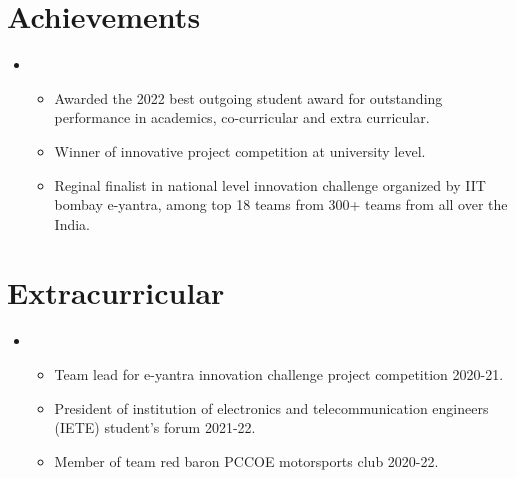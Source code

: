 \documentclass[letterpaper,11pt]{article}
\newcommand{\resumeItem}[1]{
  \item\small{
	{#1 \vspace{-2pt}}
  }
}
\newcommand{\resumeItemListStart}{\begin{itemize}}
\newcommand{\resumeItemListEnd}{\end{itemize}\vspace{-5pt}}
\begin{document}
 \vspace{-16pt}


\section{Achievements}

\vspace{2pt}

 \begin{itemize}[leftmargin=0.00in, label={}]
 
 \item
	\resumeItemListStart
 
    	\resumeItem{Awarded the 2022 best outgoing student award for outstanding performance in academics, co-curricular and extra curricular.}
     
    	\resumeItem{Winner of innovative project competition at university level.}
     
    	\resumeItem{Reginal finalist in national level innovation challenge organized by IIT bombay e-yantra, among top 18 teams from 300+ teams from all over the India.}
     
  	\resumeItemListEnd
   
 \end{itemize}
 
 \vspace{-16pt}


\section{Extracurricular}

\vspace{2pt}

 \begin{itemize}[leftmargin=0.00in, label={}]
 \item
	\resumeItemListStart
 
    	\resumeItem {Team lead for e-yantra innovation challenge project competition 2020-21.}
     
    	\resumeItem {President of institution of electronics and telecommunication engineers (IETE) student's forum 2021-22.}
     
    	\resumeItem {Member of team red baron PCCOE motorsports club 2020-22.}
     
  	\resumeItemListEnd
   
 \end{itemize}
 
 \vspace{-16pt}

\end{document}

